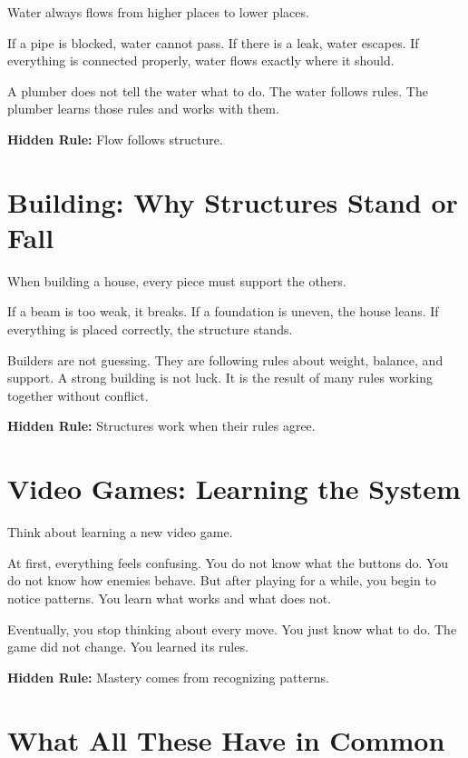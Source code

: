 \documentclass[12pt]{book}
\begin{document}
Water always flows from higher places to lower places.

If a pipe is blocked, water cannot pass. If there is a leak, water escapes.
If everything is connected properly, water flows exactly where it should.

A plumber does not tell the water what to do. The water follows rules.
The plumber learns those rules and works with them.

\textbf{Hidden Rule:} Flow follows structure.

\section{Building: Why Structures Stand or Fall}

When building a house, every piece must support the others.

If a beam is too weak, it breaks. If a foundation is uneven, the house
leans. If everything is placed correctly, the structure stands.

Builders are not guessing. They are following rules about weight, balance,
and support. A strong building is not luck. It is the result of many rules
working together without conflict.

\textbf{Hidden Rule:} Structures work when their rules agree.

\section{Video Games: Learning the System}

Think about learning a new video game.

At first, everything feels confusing. You do not know what the buttons do.
You do not know how enemies behave. But after playing for a while, you
begin to notice patterns. You learn what works and what does not.

Eventually, you stop thinking about every move. You just know what to do.
The game did not change. You learned its rules.

\textbf{Hidden Rule:} Mastery comes from recognizing patterns.

\section{What All These Have in Common}
\end{document}
